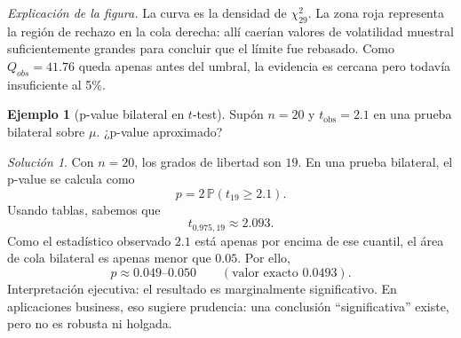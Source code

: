 \documentclass[11pt]{article}
\theoremstyle{plain}
\theoremstyle{definition}
\newtheorem{example}[theorem]{Ejemplo}
\theoremstyle{remark}
\theoremstyle{solstyle}
\newtheorem*{solution}{Solución}
\newcommand{\Pbb}{\mathbb{P}}
\newcommand{\1}{\mathbbm{1}}
\begin{document}
\begin{center}
\end{center}

\noindent\textit{Explicación de la figura.} La curva es la densidad de $\chi^2_{29}$. La zona roja representa la región de rechazo en la cola derecha: allí caerían valores de volatilidad muestral suficientemente grandes para concluir que el límite fue rebasado. Como $Q_{obs}=41.76$ queda apenas antes del umbral, la evidencia es cercana pero todavía insuficiente al 5\%.

\begin{example}[p-value bilateral en $t$-test]
Supón $n=20$ y $t_{\text{obs}}=2.1$ en una prueba bilateral sobre $\mu$. ¿p-value aproximado?
\end{example}

\begin{solution}
Con $n=20$, los grados de libertad son $19$. En una prueba bilateral, el p-value se calcula como
\[
p=2\,\Pbb(t_{19}\ge 2.1).
\]
Usando tablas, sabemos que
\[
t_{0.975,19}\approx 2.093.
\]
Como el estadístico observado $2.1$ está apenas por encima de ese cuantil, el área de cola bilateral es apenas menor que $0.05$. Por ello,
\[
p\approx 0.049\text{--}0.050
\qquad(\text{valor exacto } 0.0493).
\]
Interpretación ejecutiva: el resultado es marginalmente significativo. En aplicaciones business, eso sugiere prudencia: una conclusión ``significativa'' existe, pero no es robusta ni holgada.
\end{solution}
\end{document}
